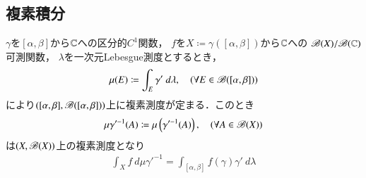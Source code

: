 \subsection{複素積分}
	$\gamma$を$[\alpha,\beta]$から$\mathbb{C}$への区分的$C^1$関数，
	$f$を$X \coloneqq \gamma([\alpha,\beta])$から$\mathbb{C}$への
	$\mathscr{B}(X)/\mathscr{B}(\mathbb{C})$可測関数，
	$\lambda$を一次元Lebesgue測度とするとき，
	\begin{align}
		\mu(E) \coloneqq \int_E \gamma'\ d\lambda,
		\quad (\forall E \in \mathscr{B}([\alpha,\beta]))
	\end{align}
	により$([\alpha,\beta],\mathscr{B}([\alpha,\beta]))$上に複素測度が定まる．このとき
	\begin{align}
		\mu \gamma'^{-1}(A) \coloneqq \mu\left( \gamma'^{-1}(A) \right),
		\quad (\forall A \in \mathscr{B}(X))
	\end{align}
	は$(X,\mathscr{B}(X))$上の複素測度となり
	\begin{align}
		\int_X f\ d\mu \gamma'^{-1} = \int_{[\alpha,\beta]} f(\gamma) \gamma'\ d\lambda
	\end{align}